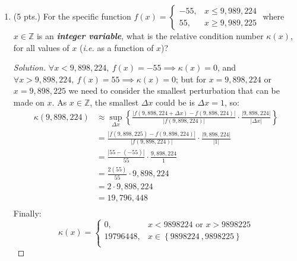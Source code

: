 \documentclass[12pt]{article}
\newcommand{\abs}[1]{\left|#1\right|}
\newcommand{\parens}[1]{\left(#1\right)}
\newcommand{\bracks}[1]{\left\{#1\right\}}
\newcommand{\bfit}[1]{\textbf{\textit{#1}}}
\begin{document}
\begin{enumerate}
\begin{enumerate}
\begin{enumerate}
     \item (5 pts.) For the specific function $f(x) = \left\{
         \begin{array}{rl} -55, & x \le 9,989,224 \\ 55, & x\ge
           9,989,225
         \end{array} \right.$ where $x\in\mathbb{Z}$ is an \bfit{integer
         variable}, what is the relative condition number $\kappa(x)$,
       for all values of $x$ (\emph{i.e.}\/ as a function of $x$)?
       \begin{proof}[Solution]
	$\forall x < 9,898,224,\ f(x) = -55 \implies \kappa(x) = 0$, and $\forall x > 9,898,224 ,\ f(x) = 55 \implies \kappa(x) = 0$; but for $x = 9,898,224$ or $x = 9,898,225$ we need to consider the smallest perturbation that can be made on $x$. As $x \in \mathbb{Z}$, the smallest $\Delta x$ could be is $\Delta x = 1$, so:
       \begin{align*}
       \kappa\parens{9,898,224} &\approx \sup_{\Delta x}\bracks{\frac{\abs{f\parens{9,898,224 + \Delta x} - f(9,898,224)}}{\abs{f(9,898,224)}}\cdot\frac{\abs{9,898,224}}{\abs{\Delta x}}}\\
       &= \frac{\abs{f\parens{9,898,225} - f(9,898,224)}}{\abs{f(9,898,224)}}\cdot\frac{\abs{9,898,224}}{\abs{1}}\\
       &= \frac{\abs{55 - (-55)}}{55}\cdot\frac{9,898,224}{1}\\
       &= \frac{2(55)}{55}\cdot9,898,224\\
       &= 2\cdot9,898,224\\
       &= 19,796,448\\
       \end{align*}
       Finally:
       $$\kappa(x) = \left\{
         \begin{array}{rl} 0, & x < 9898224 \text{ or } x > 9898225 \\ 19796448, & x \in \bracks{9898224\ , 9898225} \\
          \end{array}
       \right.$$
       \end{proof}

     \end{enumerate}


   \end{enumerate}


\end{enumerate}
\end{document}
